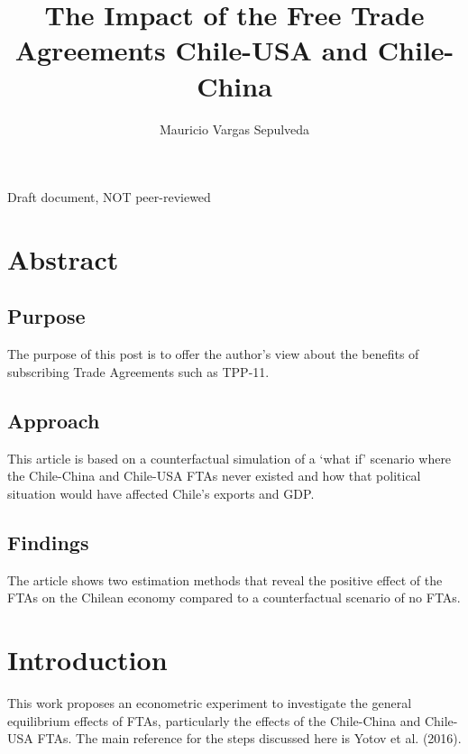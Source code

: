 \documentclass[10pt]{article}
\author{Mauricio Vargas Sepulveda}
\title{The Impact of the Free Trade Agreements Chile-USA and
Chile-China}
\date{}
\begin{document}
\maketitle

\thispagestyle{empty}
\doclicenseThis
\LARGE{Draft document, NOT peer-reviewed}\normalsize
\tableofcontents
\setcounter{page}{0}
\clearpage

\hypertarget{abstract}{%
\section{Abstract}\label{abstract}}

\hypertarget{purpose}{%
\subsection{Purpose}\label{purpose}}

The purpose of this post is to offer the author's view about the
benefits of subscribing Trade Agreements such as TPP-11.

\hypertarget{approach}{%
\subsection{Approach}\label{approach}}

This article is based on a counterfactual simulation of a `what if'
scenario where the Chile-China and Chile-USA FTAs never existed and how
that political situation would have affected Chile's exports and GDP.

\hypertarget{findings}{%
\subsection{Findings}\label{findings}}

The article shows two estimation methods that reveal the positive effect
of the FTAs on the Chilean economy compared to a counterfactual scenario
of no FTAs.

\hypertarget{introduction}{%
\section{Introduction}\label{introduction}}

This work proposes an econometric experiment to investigate the general
equilibrium effects of FTAs, particularly the effects of the Chile-China
and Chile-USA FTAs. The main reference for the steps discussed here is
Yotov et al. (2016).
\end{document}
